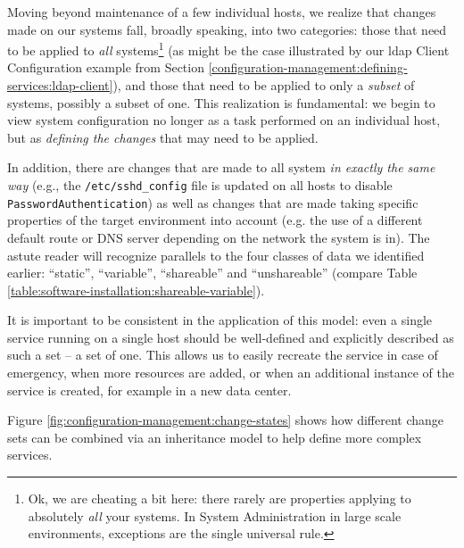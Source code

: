 Moving beyond maintenance of a few individual hosts,
we realize that changes made on our systems fall,
broadly speaking, into two categories: those that need
to be applied to {\em all} systems\footnote{Ok, we
are cheating a bit here: there rarely are properties
applying to absolutely {\em all} your systems.  In
System Administration in large scale environments,
exceptions are the single universal rule.} (as might
be the case illustrated by our \gls{ldap} Client
Configuration example from Section
\ref{configuration-management:defining-services:ldap-client}),
and those that need to be applied to only a {\em
subset} of systems, possibly a subset of one.  This
realization is fundamental: we begin to view system
configuration no longer as a task performed on an
individual host, but as {\em defining the changes}
that may need to be applied.

In addition, there are changes that are made to all
system {\em in exactly the same way} (e.g., the
{\tt /etc/sshd\_config} file is updated on all hosts to
disable {\tt PasswordAuthentication}) as well as
changes that are made taking specific properties of
the target environment into account (e.g. the use of a
different default route or DNS server depending on the
network the system is in).  The astute reader will
recognize parallels to the four classes of data we
identified earlier: ``static'', ``variable'',
``shareable'' and ``unshareable'' (compare Table
\ref{table:software-installation:shareable-variable}).

It is important to be consistent in the application of
this model:  even a single service running on a single
host should be well-defined and explicitly described
as such a set -- a set of one.  This allows us to
easily recreate the service in case of emergency, when
more resources are added, or when an additional
instance of the service is created, for example in a
new data center.

Figure
\ref{fig:configuration-management:change-states} shows
how different change sets can be combined via an
inheritance model to help define more complex
services.

